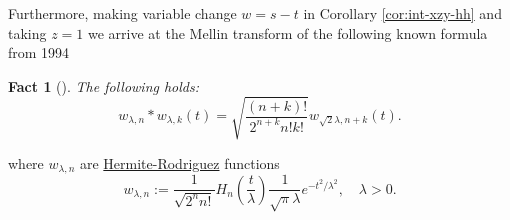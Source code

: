 \documentclass[pdf,notes]{beamer}
\newtheorem*{fact*}{Fact}
\begin{document}
\begin{frame}
	Furthermore, making variable change $w=s-t$ in Corollary \ref{cor:int-xzy-hh} and taking $z=1$ we arrive at
	the Mellin transform of the following known formula from 1994
	\begin{fact*}[{\cite[(18)]{conte1994hermite}}]
		The following holds:
		\begin{equation}
			w_{\lambda,n}\ast w_{\lambda,k}(t)=\sqrt{\frac{(n+k)!}{2^{n+k}n!k!}}w_{\sqrt{2}\lambda,n+k}(t).
			\label{eqn:mellin-hh}
		\end{equation}
	\end{fact*}
	where $w_{\lambda,n}$ are \underline{Hermite-Rodriguez} functions \cite{yusoff2007application}
	\begin{equation*}
		w_{\lambda,n}:=\frac{1}{\sqrt{2^nn!}}H_n\left( \frac{t}{\lambda} \right)\frac{1}{\sqrt{\pi}\lambda}e^{-t^2/\lambda^2},\quad \lambda>0.
	\end{equation*}
\end{frame}
\end{document}
